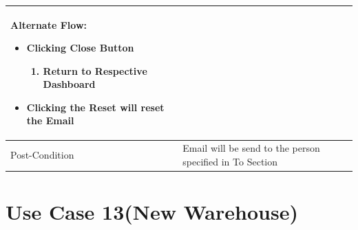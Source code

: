 \documentclass[12pt,a4paper]{report}
\begin{document}
\begin{tabular}{ | m{3cm} | m{12cm}| }
\begin{enumerate}
\end{enumerate}

Alternate Flow:

\begin{itemize}
\item 	Clicking Close Button
	\begin{enumerate}
		\item 	Return to Respective Dashboard
	\end{enumerate}
\item Clicking the Reset will reset the Email
\end{itemize}
\\ \hline
Post-Condition & Email will be send to the person specified in To Section   \\ \hline

\end{tabular}
\section{Use Case 13(New Warehouse) }
\end{document}
